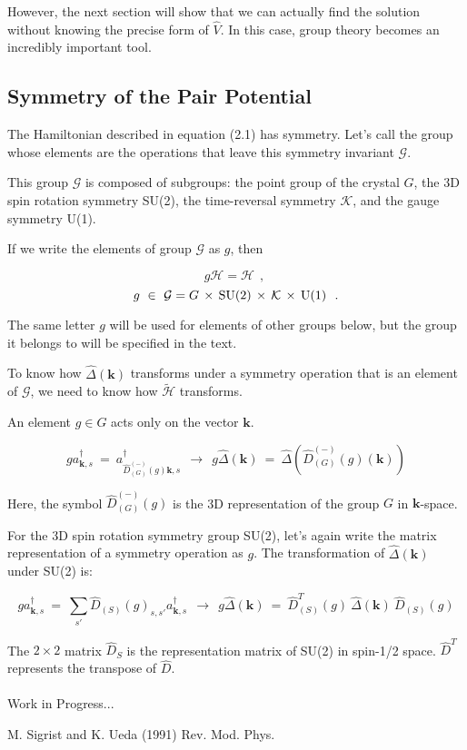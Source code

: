 \documentclass[uplatex,a4j,12pt,dvipdfmx]{jsarticle}
\begin{document}
However, the next section will show that we can actually find the solution without knowing the precise form of $\hat{V}$.
In this case, group theory becomes an incredibly important tool.
\subsection{Symmetry of the Pair Potential}

The Hamiltonian described in equation (2.1) has symmetry.
Let's call the group whose elements are the operations that leave this symmetry invariant $\mathcal{G}$.

This group $\mathcal{G}$ is composed of subgroups: the point group of the crystal $G$, the 3D spin rotation symmetry SU(2), the time-reversal symmetry $\mathcal{K}$, and the gauge symmetry U(1).

If we write the elements of group $\mathcal{G}$ as $g$, then

\[
	g
	\mathcal{H}
	=
	\mathcal{H}
	\ \ ,
	\ \]\[
	g
	\ \in \
	\mathcal{G}
	=
	G \ \! \times \ \! {\rm SU(2)} \ \! \times \ \! \mathcal{K} \ \! \times \ \! {\rm U(1)}
	\ \ .
	\nonumber
\]

The same letter $g$ will be used for elements of other groups below, but the group it belongs to will be specified in the text.

To know how $\hat{\Delta}(\bm{k})$ transforms under a symmetry operation that is an element of $\mathcal{G}$, we need to know how $\tilde{\mathcal{H}}$ transforms.

An element $g \in G$ acts only on the vector $\bm{k}$.

\[
	g a_{\bm{k},s}^{\dagger}
	\ = \
	a_{ \hat{D}_{(G)}^{(-)}(g) \bm{k},s}^{\dagger}
	\ \ \longrightarrow \ \
	g \hat{\Delta}(\bm{k})
	\ = \
	\hat{\Delta}(\hat{D}_{(G)}^{(-)}(g) (\bm{k}))
\]

Here, the symbol $\hat{D}_{(G)}^{(-)}(g)$ is the 3D representation of the group $G$ in $\bm{k}$-space.

For the 3D spin rotation symmetry group SU(2), let's again write the matrix representation of a symmetry operation as $g$.
The transformation of $\hat{\Delta}(\bm{k})$ under SU(2) is:

\[
	g a_{\bm{k},s}^{\dagger}
	\ = \
	\sum_{s'}
	\hat{D}_{(S)} (g)_{s,s'}
	a_{\bm{k},s}^{\dagger}
	\ \ \longrightarrow \ \
	g \hat{\Delta}(\bm{k})
	\ = \
	\hat{D}_{(S)}^{T} (g) \ \!
	\hat{\Delta}(\bm{k}) \ \!
	\hat{D}_{(S)} (g)
\]

The $2 \times 2$ matrix $\hat{D}_{S}$ is the representation matrix of SU(2) in spin-1/2 space.
$\hat{D}^{T}$ represents the transpose of $\hat{D}$.
\ \\

\ \\

Work in Progress...

\begin{thebibliography}{9}
	 M. Sigrist and K. Ueda (1991) Rev. Mod. Phys.

\end{thebibliography}
\end{document}
